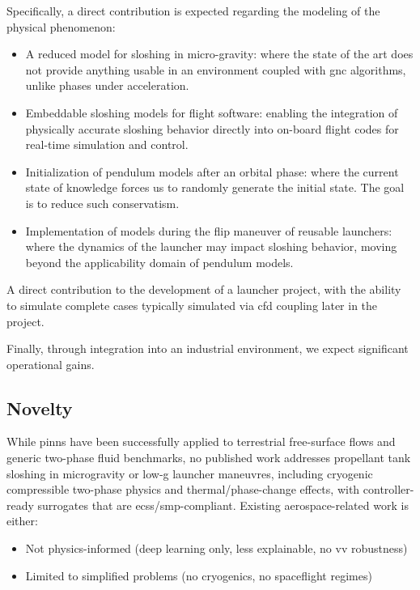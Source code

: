 \documentclass[12pt]{article}
\begin{document}
	Specifically, a direct contribution is expected regarding the modeling of the physical phenomenon:
	\begin{itemize}
		\item A reduced model for sloshing in micro-gravity: where the state of the art does not provide anything usable in an environment coupled with \acrshort{gnc} algorithms, unlike phases under acceleration.
		\item Embeddable sloshing models for flight software: enabling the integration of physically accurate sloshing behavior directly into on-board flight codes for real-time simulation and control.
		\item Initialization of pendulum models after an orbital phase: where the current state of knowledge forces us to randomly generate the initial state. The goal is to reduce such conservatism.
		\item Implementation of models during the flip maneuver of reusable launchers: where the dynamics of the launcher may impact sloshing behavior, moving beyond the applicability domain of pendulum models.
	\end{itemize}
	A direct contribution to the development of a launcher project, with the ability to simulate complete cases typically simulated via \acrshort{cfd} coupling later in the project.
	
	Finally, through integration into an industrial environment, we expect significant operational gains.
	
	\subsection*{Novelty}
	
	While \gls{pinn}s have been successfully applied to terrestrial free-surface flows and generic two-phase fluid benchmarks, no published work addresses propellant tank sloshing in microgravity or low-g launcher maneuvres, including cryogenic compressible two-phase physics and thermal/phase-change effects, with controller-ready surrogates that are \acrshort{ecss}/\acrshort{smp}-compliant.
	Existing aerospace-related work is either:
	
	\begin{itemize}
		\item Not physics-informed (deep learning only, less explainable, no \acrshort{vv} robustness)
		\item Limited to simplified problems (no cryogenics, no spaceflight regimes)
	\end{itemize}
	
\end{document}
